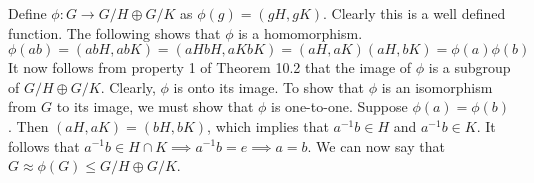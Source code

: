 \documentclass{article}
\begin{document}
Define $\phi:G\to G/H\oplus G/K$ as $\phi(g)=(gH,gK)$.  Clearly this is a well defined function.
The following shows that $\phi$ is a homomorphism.
\begin{equation*}
\phi(ab) = (abH,abK) = (aHbH,aKbK) = (aH,aK)(aH,bK) = \phi(a)\phi(b)
\end{equation*}
It now follows from property 1 of Theorem 10.2 that the image of $\phi$ is
a subgroup of $G/H\oplus G/K$.  Clearly, $\phi$ is onto its image.  To show
that $\phi$ is an isomorphism from $G$ to its image, we must show that $\phi$ is one-to-one.
Suppose $\phi(a)=\phi(b)$.  Then $(aH,aK)=(bH,bK)$, which implies that $a^{-1}b\in H$
and $a^{-1}b\in K$.  It follows that $a^{-1}b\in H\cap K\implies a^{-1}b=e\implies a=b$.
We can now say that $G\approx\phi(G)\leq G/H\oplus G/K$.
\end{document}
